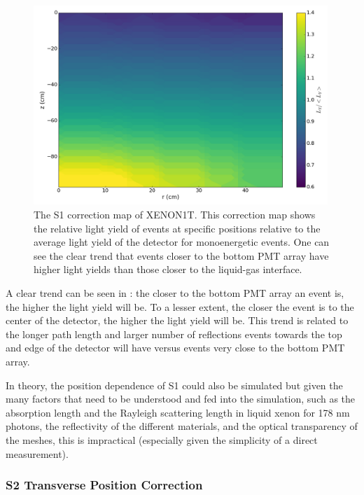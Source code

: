 \begin{figure}[t]
	\centering
	\includegraphics[width=0.99\textwidth]{xe1t_s1_correction_map}
	\caption{The S1 correction map of XENON1T.  This correction map shows the relative light yield of events at specific positions relative to the average light yield of the detector for monoenergetic events.  One can see the clear trend that events closer to the bottom PMT array have higher light yields than those closer to the liquid-gas interface.}
	\label{fig:xe1t_s1_correction_map}
\end{figure}


A clear trend can be seen in : the closer to the bottom PMT array an event is, the higher the light yield will be.  To a lesser extent, the closer the event is to the center of the detector, the higher the light yield will be.  This trend is related to the longer path length and larger number of reflections events towards the top and edge of the detector will have versus events very close to the bottom PMT array.

In theory, the position dependence of S1 could also be simulated but given the many factors that need to be understood and fed into the simulation, such as the absorption length and the Rayleigh scattering length in liquid xenon for 178 nm photons, the reflectivity of the different materials, and the optical transparency of the meshes, this is impractical (especially given the simplicity of a direct measurement).


\subsubsection{S2 Transverse Position Correction}

